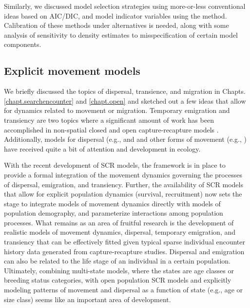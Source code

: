 Similarly, we discussed model selection strategies using more-or-less
conventional ideas based on AIC/DIC, and model indicator variables
using the \citet{kuo_mallick:1998} method. Calibration of these
methods under alternatives is needed, along with some analysis of
sensitivity to density estimates to misspecification of certain model
components.



\subsection{Explicit movement models}


We briefly discussed the topics of dispersal, transience, and
migration in Chapts. \ref{chapt.searchencounter} and \ref{chapt.open}
and sketched out a few ideas that allow for dynamics related to
movement or migration.  Temporary emigration and transiency are two
topics where a significant amount of work has been accomplished in
non-spatial closed and open capture-recapture models
\citep{kendall_etal:1997, pradel_hines:1997, hines_etal:2003,
  clavel_etal:2008, gilroy_etal:2012,chandler_etal:2011}.
Additionally, models for dispersal (e.g., \citet{clobert_etal:2001,
  ovaskainen:2004, ovaskainen_etal:2008} and and other forms of
movement (e.g., \cite{jonsen_etal:2005, johnson_etal:2008b,
  mcclintock_etal:2012}) have received quite a bit of attention and
development in ecology.

With the recent development of SCR models, the framework is in place
to provide a formal integration of the movement dynamics governing the
processes of dispersal, emigration, and transiency.  Further, the
availability of SCR models that allow for explicit population dynamics
(survival, recruitment) \citep{gardner_etal:2010ecol} now sets the
stage to integrate models of movement dynamics directly with models of
population demography, and parameterize interactions among population
processes. What remains as an area of fruitful research is the
development of realistic models of movement dynamics, dispersal,
temporary emigration, and transiency that can be effectively fitted
given typical sparse individual encounter history data generated from
capture-recapture studies.  Dispersal and emigration can also be
related to the life stage of an individual in a certain population.
Ultimately, combining multi-state models, where the states are age
classes or breeding status categories, with open population SCR models
and explicitly modeling patterns of movement and dispersal as a
function of state (e.g., age or size class) seems like an important
area of development.


